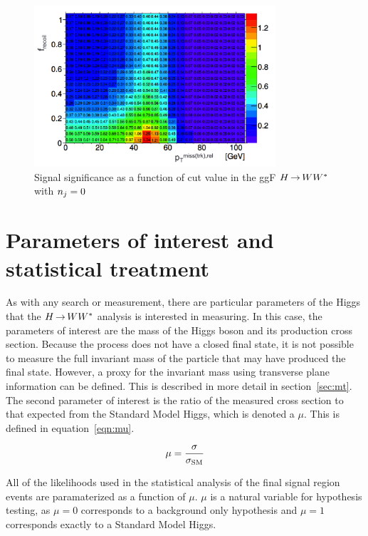 \begin{figure}[h!]
  \centering
  \captionsetup{justification=centering}

  \includegraphics[width=0.8\textwidth]{figures/SFoptimization}
  \caption{Signal significance as a function of cut value in the ggF $H{\,{\rightarrow}\,}WW^\ast$ with $n_j = 0$}
  \label{fig:optimization}
\end{figure}


\section{Parameters of interest and statistical treatment}
 
As with any search or measurement, there are particular parameters of the Higgs that the $H{\,{\rightarrow}\,}WW^\ast$ analysis is interested in measuring. In this case, the parameters of interest are the mass of the Higgs boson and its production cross section. Because the \HWWfull process does not have a closed final state, it is not possible to measure the full invariant mass of the particle that may have produced the final state. However, a proxy for the invariant mass using transverse plane information can be defined. This is described in more detail in section~\ref{sec:mt}. The second parameter of interest is the ratio of the measured cross section to that expected from the Standard Model Higgs, which is denoted a $\mu$. This is defined in equation~\ref{eqn:mu}.

\begin{equation}
\mu = \frac{\sigma}{\sigma_{\rm SM}}
\label{eqn:mu}
\end{equation}

All of the likelihoods used in the statistical analysis of the final signal region events are paramaterized as a function of $\mu$. $\mu$ is a natural variable for hypothesis testing, as $\mu = 0$ corresponds to a background only hypothesis and $\mu = 1$ corresponds exactly to a Standard Model Higgs. 

